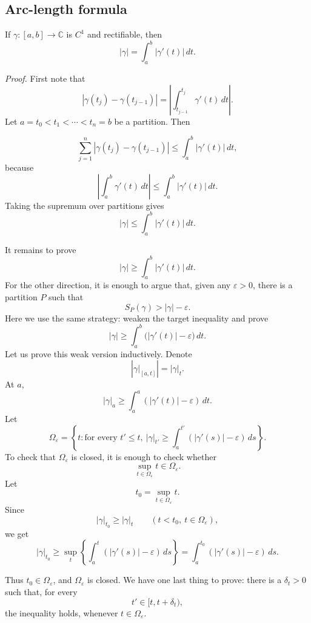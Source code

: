 \documentclass[11pt,a4paper]{article}
\begin{document}
\subsection*{Arc-length formula}
If \(\gamma\colon[a,b]\to\mathbb C\)
is $C^1$ and rectifiable, then
\[
|\gamma|=\int_a^b|\gamma'(t)|\,dt.
\]

\textit{Proof.}
First note that
\[
|\gamma(t_j)-\gamma(t_{j-1})|
=\left|\int_{t_{j-1}}^{t_j}\gamma'(t)\,dt\right|.
\]
Let \(a=t_0<t_1<\cdots<t_n=b\)
be a partition. Then


\[
\sum_{j=1}^{n}|\gamma(t_j)-\gamma(t_{j-1})|
\leq\int_a^b|\gamma'(t)|\,dt,
\]
because
\[
\left|\int_a^b\gamma'(t)\,dt\right|
\leq\int_a^b|\gamma'(t)|\,dt.
\]
Taking the supremum over partitions gives
\[
|\gamma|\leq\int_a^b|\gamma'(t)|\,dt.
\]

It remains to prove
\[
|\gamma|\geq\int_a^b|\gamma'(t)|\,dt.
\]
For the other direction, it is enough to argue that, given any $\varepsilon>0$, there is a partition $P$ such that
\[
S_P(\gamma)>|\gamma|-\varepsilon.
\]
Here we use the same strategy: weaken the target inequality and prove
\[
|\gamma|\geq\int_a^b\bigl(|\gamma'(t)|-\varepsilon\bigr)\,dt.
\]
Let us prove this weak version inductively. Denote
\[
\left|\gamma\big|_{[a,t]}\right|=|\gamma|_t.
\]
At $a$,
\[
|\gamma|_a\geq\int_a^a(|\gamma'(t)|-\varepsilon)\,dt.
\]
Let
\[
\Omega_\varepsilon=
\left\{t:
\text{for every }t'\leq t,
\ |\gamma|_{t'}\geq
\int_a^{t'}(|\gamma'(s)|-\varepsilon)\,ds
\right\}.
\]
To check that $\Omega_\varepsilon$ is closed, it is enough to check whether
\[
\sup_{t\in\Omega_\varepsilon}t\in\Omega_\varepsilon.
\]
Let
\[
t_0=\sup_{t\in\Omega_\varepsilon}t.
\]
Since
\[
|\gamma|_{t_0}\geq|\gamma|_t
\qquad(t<t_0,\ t\in\Omega_\varepsilon),
\]
we get
\[
|\gamma|_{t_0}
\geq\sup_t\left\{
\int_a^t(|\gamma'(s)|-\varepsilon)\,ds
\right\}
=\int_a^{t_0}(|\gamma'(s)|-\varepsilon)\,ds.
\]


Thus $t_0\in\Omega_\varepsilon$, and $\Omega_\varepsilon$ is closed. We have one last thing to prove: there is a $\delta_t>0$ such that, for every
\[
t'\in[t,t+\delta_t),
\]
the inequality holds, whenever $t\in\Omega_\varepsilon$.
\end{document}
